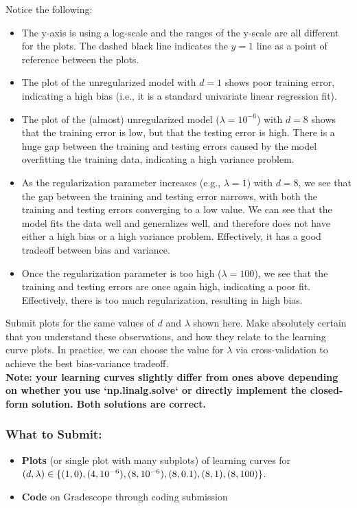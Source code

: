 \documentclass{article}
\begin{document}
\begin{aprob}
    Notice the following:
    \begin{itemize}
        \item The y-axis is using a log-scale and the ranges of the y-scale are all different for the plots.  The dashed black line indicates the $y=1$ line as a point of reference between the plots.
        \item The plot of the unregularized model with $d = 1$ shows poor training error, indicating a high bias (i.e., it is a standard univariate linear regression fit).
        \item The plot of the (almost) unregularized model ($\lambda = 10^{-6}$) with $d = 8$ shows that the training error is low, but that the testing error is high.  There is a huge gap between the training and testing errors caused by the model overfitting the training data, indicating a high variance problem.
        \item As the regularization parameter increases (e.g., $\lambda = 1$) with $d = 8$, we see that the gap between the training and testing error narrows, with both the training and testing errors converging to a low value.  We can see that the model fits the data well and generalizes well, and therefore does not have either a high bias or a high variance problem.  Effectively, it has a good tradeoff between bias and variance.
        \item Once the regularization parameter is too high ($\lambda = 100$), we see that the training and testing errors are once again high, indicating a poor fit.  Effectively, there is too much regularization, resulting in high bias.
    \end{itemize}
    
    Submit plots for the same values of $d$ and $\lambda$ shown here. Make absolutely certain that you understand these observations, and how they relate to the learning curve plots.  In practice, we can choose the value for $\lambda$ via cross-validation to achieve the best bias-variance tradeoff.
    \\
    
    \textbf{Note: your learning curves slightly differ from ones above depending on whether you use `np.linalg.solve` or directly implement the closed-form solution. Both solutions are correct.}

    
    \subsubsection*{What to Submit:}
    \begin{itemize}
        \item \textbf{Plots} (or single plot with many subplots) of learning curves for $(d, \lambda) \in \{(1, 0), (4, 10^{-6}), (8, 10^{-6}), \\ (8, 0.1), (8, 1), (8, 100)\}$.
        \item \textbf{Code} on Gradescope through coding submission
    \end{itemize}
\end{aprob}
\end{document}
